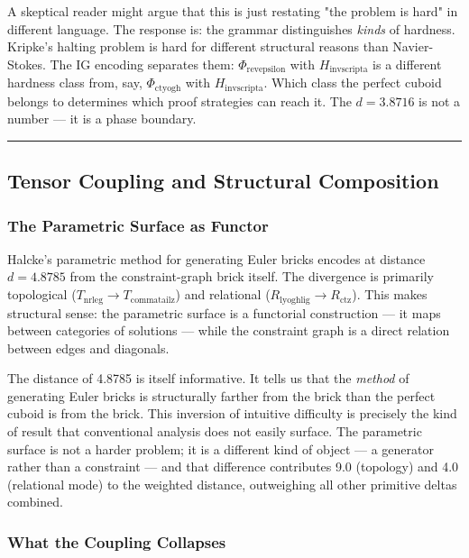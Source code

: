\documentclass[12pt,a4paper]{article}
\begin{document}
A skeptical reader might argue that this is just restating "the problem is hard" in different language. The response is: the grammar distinguishes \emph{kinds} of hardness. Kripke's halting problem is hard for different structural reasons than Navier-Stokes. The IG encoding separates them: $\Phi_{\text{revepsilon}}$ with $H_{\text{invscripta}}$ is a different hardness class from, say, $\Phi_{\text{ctyogh}}$ with $H_{\text{invscripta}}$. Which class the perfect cuboid belongs to determines which proof strategies can reach it. The $d = 3.8716$ is not a number --- it is a phase boundary.

\begin{center}
\rule{0.5\textwidth}{0.4pt}
\end{center}

\subsection{Tensor Coupling and Structural Composition}

\subsubsection{The Parametric Surface as Functor}

Halcke's parametric method for generating Euler bricks encodes at distance $d = 4.8785$ from the constraint-graph brick itself. The divergence is primarily topological ($T_{\text{nrleg}} \to T_{\text{commatailz}}$) and relational ($R_{\text{lyoghlig}} \to R_{\text{ctz}}$). This makes structural sense: the parametric surface is a functorial construction --- it maps between categories of solutions --- while the constraint graph is a direct relation between edges and diagonals.

The distance of 4.8785 is itself informative. It tells us that the \emph{method} of generating Euler bricks is structurally farther from the brick than the perfect cuboid is from the brick. This inversion of intuitive difficulty is precisely the kind of result that conventional analysis does not easily surface. The parametric surface is not a harder problem; it is a different kind of object --- a generator rather than a constraint --- and that difference contributes 9.0 (topology) and 4.0 (relational mode) to the weighted distance, outweighing all other primitive deltas combined.

\subsubsection{What the Coupling Collapses}
\end{document}
